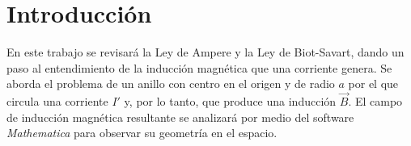 \section{Introducción}
En este trabajo se revisará la Ley de Ampere y la Ley de Biot-Savart, dando un paso al entendimiento de la inducción magnética que una corriente genera. Se aborda el problema de un anillo con centro en el origen y de radio $a$ por el que circula una corriente $I'$ y, por lo tanto, que produce una inducción $\vec{B}$. El campo de inducción magnética resultante se analizará por medio del software \emph{Mathematica} para observar su geometría en el espacio.